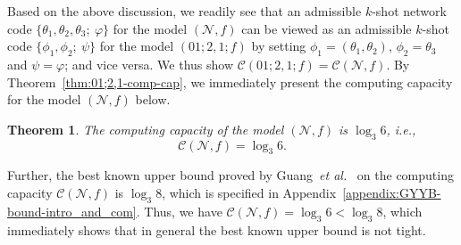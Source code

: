 \documentclass[11pt,draftclsnofoot,onecolumn]{IEEEtran}
\newtheorem{theorem}{Theorem}
\begin{document}
{ Based on the above discussion, we readily see that an admissible $k$-shot network code $\big\{\theta_1,\theta_2,\theta_3;~\varphi\big\}$ for the model $(\mathcal{N},f)$ can be viewed as an admissible $k$-shot code $\big\{\phi_{1},\phi_{2};~\psi\big\}$ for the model $(01;2,1;f)$ by setting $\phi_1=(\theta_1,\theta_2)$, $\phi_2=\theta_3$ and $\psi=\varphi$; and vice versa. We thus show
$\mathcal{C}(01;2,1;f)=\mathcal{C}(\mathcal{N},f)$.
By Theorem~\ref{thm:01;2,1-comp-cap}, we immediately present the computing capacity for the model $(\mathcal{N},f)$  below.

\begin{theorem}\label{thm:N_cap}
The computing capacity of the model $(\mathcal{N},f)$ is $\log_{3}6$, i.e.,
\begin{equation*}
\mathcal{C}(\mathcal{N},f)=\log_{3} 6.
\end{equation*}
\end{theorem}

Further, the best known upper bound proved by Guang~\emph{et al.}~\cite{Guang_Improved_upper_bound} on the computing capacity $\mathcal{C}(\mathcal{N},f)$ is $\log_{3}8$, which is specified in Appendix~\ref{appendix:GYYB-bound-intro_and_com}. Thus, we have $\mathcal{C}(\mathcal{N},f)=\log_{3}6<\log_{3}8$, which immediately shows that in general the best known upper bound is not tight.


}
\end{document}
